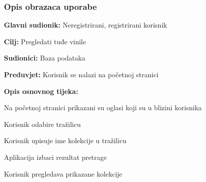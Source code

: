 				\subsubsection{Opis obrazaca uporabe}
					

				\noindent {}
					\begin{packed_item}
	
						\item \textbf{Glavni sudionik: }Neregistrirani, registrirani korisnik
						\item  \textbf{Cilj:} Pregledati tuđe vinile
						\item  \textbf{Sudionici:} Baza podataka
						\item  \textbf{Preduvjet:} Korisnik se nalazi na početnoj stranici
						\item  \textbf{Opis osnovnog tijeka:}
						
						\item[] \begin{packed_enum}
	
							\item Na početnoj stranici prikazani su oglasi koji su u blizini korisnika
							\item Korisnik odabire tražilicu
							\item Korisnik upisuje ime kolekcije u tražilicu
							\item Aplikacija izbaci rezultat pretrage
							\item Korisnik pregledava prikazane kolekcije

						\end{packed_enum}						
					\end{packed_item}
					
